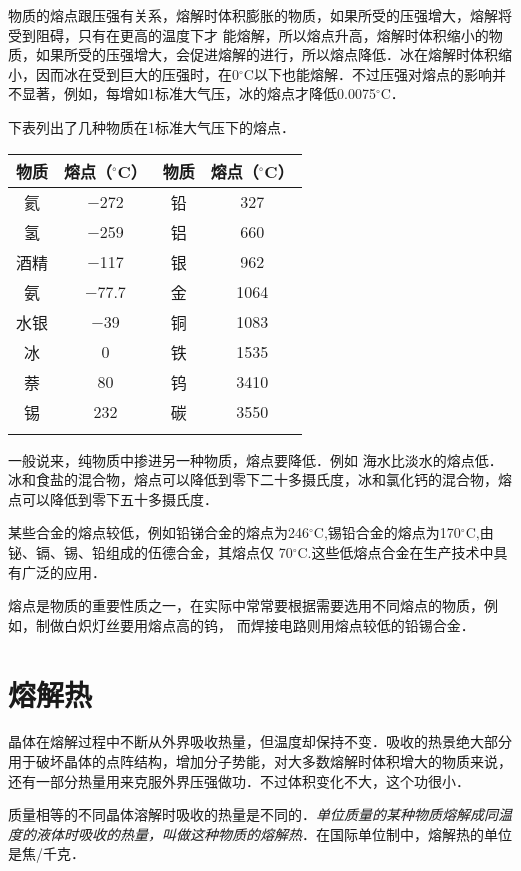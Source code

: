 物质的熔点跟压强有关系，熔解时体积膨胀的物质，如果所受的压强增大，熔解将受到阻碍，只有在更高的温度下才
能熔解，所以熔点升高，熔解时体积缩小的物质，如果所受的压强增大，会促进熔解的进行，所以熔点降低．冰在熔解时体积缩小，因而冰在受到巨大的压强时，在0$^\circ$C以下也能熔解．不过压强对熔点的影响并不显著，例如，每增如1标准大气压，冰的熔点才降低0.0075$^\circ$C．

下表列出了几种物质在1标准大气压下的熔点．

\begin{center}
    \begin{tabular}{cccc}
\hline
物质 & 熔点（$^\circ$C） & 物质 & 熔点（$^\circ$C） \\
\hline
氦 & $-$272 & 铅 & 327\\
氢& $-$259 & 铝 & 660\\
酒精& $-$117 & 银 & 962\\
氨& $-$77.7 & 金 & 1064\\
水银& $-$39 & 铜 & 1083\\
冰& 0 & 铁 & 1535\\
萘&80 & 钨 & 3410\\
锡&232   & 碳 & 3550\\
\hline
  &  \end{tabular}
\end{center}

一般说来，纯物质中掺进另一种物质，熔点要降低．例如
海水比淡水的熔点低．冰和食盐的混合物，熔点可以降低到零下二十多摄氏度，冰和氯化钙的混合物，熔点可以降低到零下五十多摄氏度．

某些合金的熔点较低，例如铅锑合金的熔点为246$^\circ$C,锡铅合金的熔点为170$^\circ$C,由铋、镉、锡、铅组成的伍德合金，其熔点仅 70$^\circ$C.这些低熔点合金在生产技术中具有广泛的应用．

熔点是物质的重要性质之一，在实际中常常要根据需要选用不同熔点的物质，例如，制做白炽灯丝要用熔点高的钨，
而焊接电路则用熔点较低的铅锡合金．

\section{熔解热}
晶体在熔解过程中不断从外界吸收热量，但温度却保持不变．吸收的热景绝大部分用于破坏晶体的点阵结构，增加分子势能，对大多数熔解时体积增大的物质来说，还有一部分热量用来克服外界压强做功．不过体积变化不大，这个功很小．

质量相等的不同晶体溶解时吸收的热量是不同的．\textit{单位质量的某种物质熔解成同温度的液体时吸收的热量，叫做这种物质的熔解热}．在国际单位制中，熔解热的单位是焦/千克．

